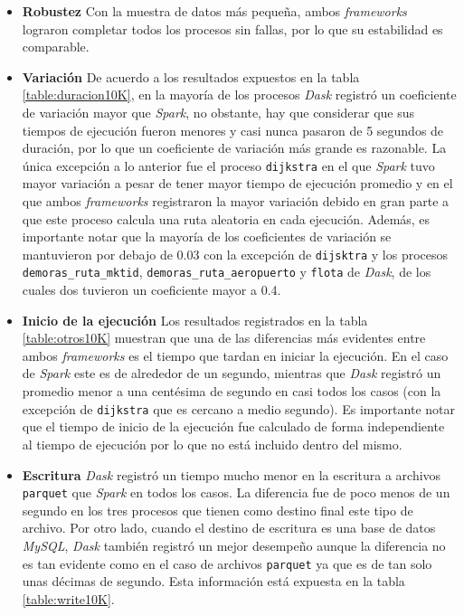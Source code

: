 \begin{itemize}
	
	\item \textbf{Robustez} Con la muestra de datos más pequeña, ambos \textit{frameworks} lograron completar todos los procesos sin fallas, por lo que su estabilidad es comparable.
	
	\item \textbf{Variación} De acuerdo a los resultados expuestos en la tabla \ref{table:duracion10K}, en la mayoría de los procesos \textit{Dask} registró un coeficiente de variación mayor que \textit{Spark}, no obstante, hay que considerar que sus tiempos de ejecución fueron menores y casi nunca pasaron de 5 segundos de duración, por lo que un coeficiente de variación más grande es razonable. La única excepción a lo anterior fue el proceso \texttt{dijkstra} en el que \textit{Spark} tuvo mayor variación a pesar de tener mayor tiempo de ejecución promedio y en el que ambos \textit{frameworks} registraron la mayor variación debido en gran parte a que este proceso calcula una ruta aleatoria en cada ejecución. Además, es importante notar que la mayoría de los coeficientes de variación se mantuvieron por debajo de 0.03 con la excepción de \texttt{dijsktra} y los procesos \texttt{demoras\_ruta\_mktid}, \texttt{demoras\_ruta\_aeropuerto} y \texttt{flota} de \textit{Dask}, de los cuales dos tuvieron un coeficiente mayor a 0.4.
	
	\item \textbf{Inicio de la ejecución} Los resultados registrados en la tabla \ref{table:otros10K} muestran que una de las diferencias más evidentes entre ambos \textit{frameworks} es el tiempo que tardan en iniciar la ejecución. En el caso de \textit{Spark} este es de alrededor de un segundo, mientras que \textit{Dask} registró un promedio menor a una centésima de segundo en casi todos los casos (con la excepción de \texttt{dijkstra} que es cercano a medio segundo). Es importante notar que el tiempo de inicio de la ejecución fue calculado de forma independiente al tiempo de ejecución por lo que no está incluido dentro del mismo.
	
	\item \textbf{Escritura} \textit{Dask} registró un tiempo mucho menor en la escritura a archivos \texttt{parquet} que \textit{Spark} en todos los casos. La diferencia fue de poco menos de un segundo en los tres procesos que tienen como destino final este tipo de archivo. Por otro lado, cuando el destino de escritura es una base de datos \textit{MySQL}, \textit{Dask} también registró un mejor desempeño aunque la diferencia no es tan evidente como en el caso de archivos \texttt{parquet} ya que es de tan solo unas décimas de segundo. Esta información está expuesta en la tabla \ref{table:write10K}.
	

\end{itemize}
